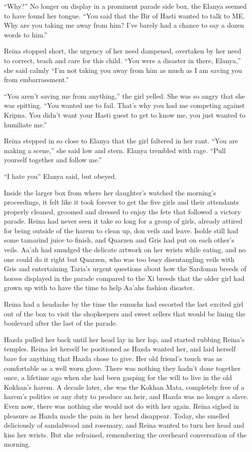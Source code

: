 \documentclass{article}
\begin{document}
	“Why?” No longer on display in a prominent parade side box, the Elanya seemed to have found her tongue. “You said that the Bir of Hasti wanted to talk to ME. Why are you taking me away from him? I’ve barely had a chance to say a dozen words to him.”
	
	Reina stopped short, the urgency of her need dampened, overtaken by her need to correct, teach and care for this child. “You were a disaster in there, Elanya,” she said calmly “I’m not taking you away from him as much as I am saving you from embarrassment.” 
	
	“You aren’t saving me from anything,” the girl yelled. She was so angry that she was spitting. “You wanted me to fail. That’s why you had me competing against Kripna. You didn’t want your Hasti guest to get to know me, you just wanted to humiliate me.” 
	
	Reina stepped in so close to Elanya that the girl faltered in her rant. “You are making a scene,” she said low and stern. Elanya trembled with rage. “Pull yourself together and follow me.” 
	
	“I hate you” Elanya said, but obeyed.
	
	Inside the larger box from where her daughter’s watched the morning’s proceedings, it felt like it took forever to get the five girls and their attendants properly cleaned, groomed and dressed to enjoy the fete that followed a victory parade. Reina had never seen it take so long for a group of girls, already attired for being outside of the harem to clean up, don veils and leave. Isolde still had some tamarind juice to finish, and Quarzen and Gris had put on each other’s veils. Aa’ah had smudged the delicate artwork on her wrists while eating, and no one could do it right but Quarzen, who was too busy disentangling veils with Gris and entertaining Taria’s urgent questions about how the Sardonan breeds of horses displayed in the parade compared to the Xi breeds that the older girl had grown up with to have the time to help Aa’ahs fashion disaster.
	
	Reina had a headache by the time the eunuchs had escorted the last excited girl out of the box to visit the shopkeepers and sweet sellers that would be lining the boulevard after the last of the parade. 
	
	Hazda pulled her back until her head lay in her lap, and started rubbing Reina’s temples. Reina let herself be positioned as Hazda wanted her, and laid herself bare for anything that Hazda chose to give. Her old friend’s touch was as comfortable as a well worn glove. There was nothing they hadn’t done together once, a lifetime ago when she had been gasping for the will to live in the old Kokhan’s harem. A decade later, she was the Kokhan Mata, completely free of a harem’s politics or any duty to produce an heir, and Hazda was no longer a slave. Even now, there was nothing she would not do with her again. Reina sighed in pleasure as Hazda made the pain in her head disappear. Today, she smelled deliciously of sandalwood and rosemary, and Reina wanted to turn her head and kiss her wrists. But she refrained, remembering the overheard conversation of the morning.
	
\end{document}
